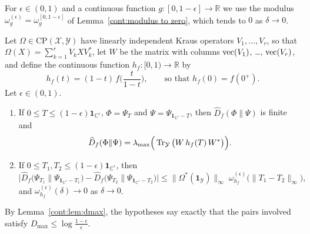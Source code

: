  For $\epsilon\in(0,1)$ and a continuous function $g:[0,1-\epsilon]\to\mathbb{R}$ we use the modulus $\omega^{(\epsilon)}_g=\omega^{[0,1-\epsilon]}_g$ of Lemma~\ref{cont:modulus to zero}, which tends to $0$ as $\delta\to0$.

\begin{theorem}\label{cont:thm:unbounded}
Let $\Omega\in\mathrm{CP}(\mathcal{X},\mathcal{Y})$ have linearly independent Kraus operators $V_1,\dots,V_r$, so that $\Omega(X)=\sum_{k=1}^rV_kXV_k^*$, let $W$ be the matrix with columns $\operatorname{vec}(V_1)$, \dots, $\operatorname{vec}(V_r)$, and define the continuous function $h_f:[0,1)\to\mathbb{R}$ by
\[
h_f(t)=(1-t)\,f\Big(\frac{t}{1-t}\Big),\qquad\text{so that } h_f(0)=f(0^+).
\]
Let $\epsilon\in(0,1)$.
\begin{enumerate}
\item[(a)] If $0\leq T\leq(1-\epsilon)\mathbf{1}_{\mathbb{C}^r}$, $\Phi=\Psi_T$ and $\Psi=\Psi_{\mathbf{1}_{\mathbb{C}^r}-T}$, then $\widehat{D}_f(\Phi\|\Psi)$ is finite and
\[
\widehat{D}_f(\Phi\|\Psi)=\lambda_{\max}\Big(\operatorname{Tr}_{\mathcal{Y}}\big(W\,h_f(T)\,W^*\big)\Big).
\]
\item[(b)] If $0\leq T_1,T_2\leq(1-\epsilon)\mathbf{1}_{\mathbb{C}^r}$, then
\[
\Big|\widehat{D}_f\big(\Psi_{T_1}\big\|\Psi_{\mathbf{1}_{\mathbb{C}^r}-T_1}\big)-\widehat{D}_f\big(\Psi_{T_2}\big\|\Psi_{\mathbf{1}_{\mathbb{C}^r}-T_2}\big)\Big|
\leq\|\Omega^*(\mathbf{1}_{\mathcal{Y}})\|_\infty\;\omega^{(\epsilon)}_{h_f}\big(\|T_1-T_2\|_\infty\big),
\]
and $\omega^{(\epsilon)}_{h_f}(\delta)\to0$ as $\delta\to0$.
\end{enumerate}
By Lemma~\ref{cont:lem:dmax}, the hypotheses say exactly that the pairs involved satisfy $D_{\max}\leq\log\frac{1-\epsilon}{\epsilon}$.
\end{theorem}

